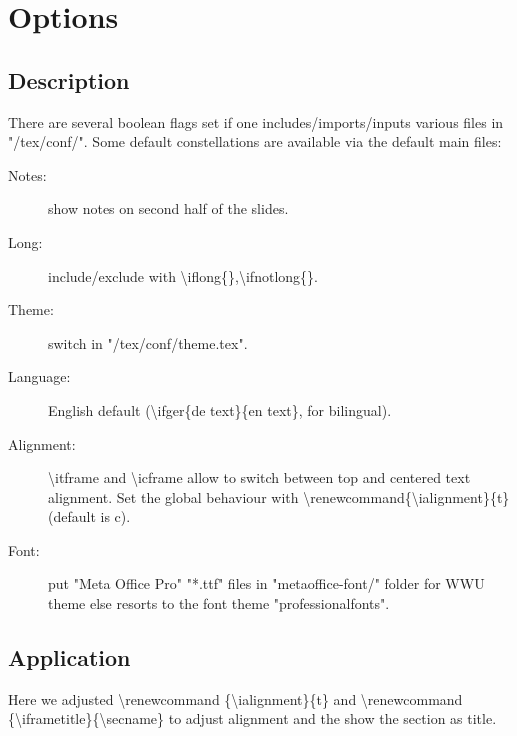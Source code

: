 
\section{Options}
\subsection{Description}
\begin{iframe}
There are several boolean flags set if one includes/imports/inputs various files in "/tex/conf/". Some default constellations are available via the default main files:

\begin{description}
\item[Notes:] show notes on second half of the slides.
\item[Long:] include/exclude with \textbackslash iflong\{\},\textbackslash ifnotlong\{\}.
\item[Theme:] switch in "/tex/conf/theme.tex".
\item[Language:] English default (\textbackslash ifger\{de text\}\{en text\}, for bilingual).
\item[Alignment:] \textbackslash itframe and \textbackslash icframe allow to switch between top and centered text alignment. Set the global behaviour with \textbackslash renewcommand\{\textbackslash ialignment\}\{t\} (default is c).
\item[Font:] put "Meta Office Pro" "*.ttf" files in "metaoffice-font/" folder for WWU theme else resorts to the font theme "professionalfonts".
\end{description}
\end{iframe}

\subsection{Application}
\begingroup
\renewcommand{\ialignment}{t}
\renewcommand{\iframetitle}{\secname}
\begin{iframe}[-10pt]
	Here we adjusted \textbackslash renewcommand \{\textbackslash ialignment\}\{t\} and  \textbackslash renewcommand \{\textbackslash iframetitle\}\{\textbackslash secname\} to adjust alignment and the show the section as title.
\end{iframe}
\endgroup